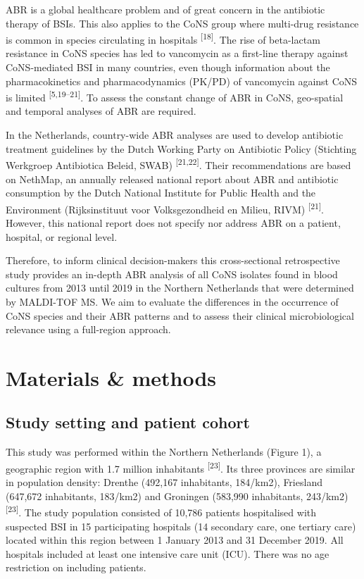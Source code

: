 \documentclass[
]{book}
\begin{document}
ABR is a global healthcare problem and of great concern in the antibiotic therapy of BSIs. This also applies to the CoNS group where multi-drug resistance is common in species circulating in hospitals \textsuperscript{{[}18{]}}. The rise of beta-lactam resistance in CoNS species has led to vancomycin as a first-line therapy against CoNS-mediated BSI in many countries, even though information about the pharmacokinetics and pharmacodynamics (PK/PD) of vancomycin against CoNS is limited \textsuperscript{{[}5,19--21{]}}. To assess the constant change of ABR in CoNS, geo-spatial and temporal analyses of ABR are required.

In the Netherlands, country-wide ABR analyses are used to develop antibiotic treatment guidelines by the Dutch Working Party on Antibiotic Policy (Stichting Werkgroep Antibiotica Beleid, SWAB) \textsuperscript{{[}21,22{]}}. Their recommendations are based on NethMap, an annually released national report about ABR and antibiotic consumption by the Dutch National Institute for Public Health and the Environment (Rijksinstituut voor Volksgezondheid en Milieu, RIVM) \textsuperscript{{[}21{]}}. However, this national report does not specify nor address ABR on a patient, hospital, or regional level.

Therefore, to inform clinical decision-makers this cross-sectional retrospective study provides an in-depth ABR analysis of all CoNS isolates found in blood cultures from 2013 until 2019 in the Northern Netherlands that were determined by MALDI-TOF MS. We aim to evaluate the differences in the occurrence of CoNS species and their ABR patterns and to assess their clinical microbiological relevance using a full-region approach.

\hypertarget{materials-methods}{%
\section{Materials \& methods}\label{materials-methods}}

\hypertarget{study-setting-and-patient-cohort}{%
\subsection{Study setting and patient cohort}\label{study-setting-and-patient-cohort}}

This study was performed within the Northern Netherlands (Figure 1), a geographic region with 1.7 million inhabitants \textsuperscript{{[}23{]}}. Its three provinces are similar in population density: Drenthe (492,167 inhabitants, 184/km2), Friesland (647,672 inhabitants, 183/km2) and Groningen (583,990 inhabitants, 243/km2) \textsuperscript{{[}23{]}}. The study population consisted of 10,786 patients hospitalised with suspected BSI in 15 participating hospitals (14 secondary care, one tertiary care) located within this region between 1 January 2013 and 31 December 2019. All hospitals included at least one intensive care unit (ICU). There was no age restriction on including patients.
\end{document}
